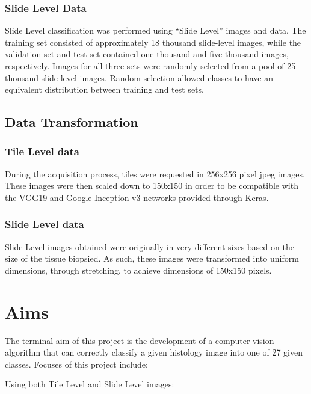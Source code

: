 \documentclass[12pt,]{article}
\begin{document}
\subsubsection{Slide Level Data}\label{slide-level-data}

Slide Level classification was performed using ``Slide Level'' images
and data. The training set consisted of approximately 18 thousand
slide-level images, while the validation set and test set contained one
thousand and five thousand images, respectively. Images for all three
sets were randomly selected from a pool of 25 thousand slide-level
images. Random selection allowed classes to have an equivalent
distribution between training and test sets.

\subsection{Data Transformation}\label{data-transformation}

\subsubsection{Tile Level data}\label{tile-level-data-1}

During the acquisition process, tiles were requested in 256x256 pixel
jpeg images. These images were then scaled down to 150x150 in order to
be compatible with the VGG19 and Google Inception v3 networks provided
through Keras.

\subsubsection{Slide Level data}\label{slide-level-data-1}

Slide Level images obtained were originally in very different sizes
based on the size of the tissue biopsied. As such, these images were
transformed into uniform dimensions, through stretching, to achieve
dimensions of 150x150 pixels.

\section{Aims}\label{aims}

The terminal aim of this project is the development of a computer vision
algorithm that can correctly classify a given histology image into one
of 27 given classes. Focuses of this project include:

Using both Tile Level and Slide Level images:
\end{document}

